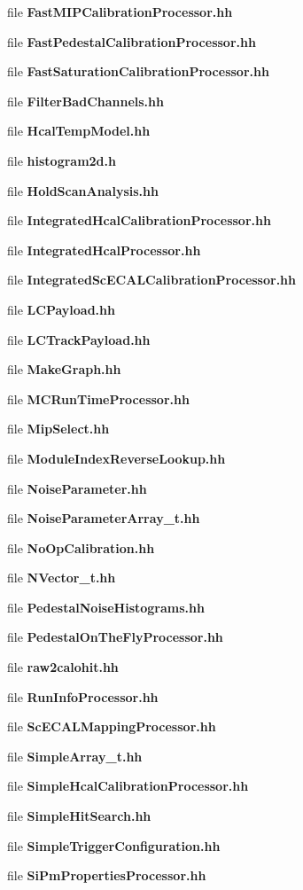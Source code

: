 \begin{DoxyCompactItemize}
\item 
file {\bfseries FastMIPCalibrationProcessor.hh}
\item 
file {\bfseries FastPedestalCalibrationProcessor.hh}
\item 
file {\bfseries FastSaturationCalibrationProcessor.hh}
\item 
file {\bfseries FilterBadChannels.hh}
\item 
file {\bfseries HcalTempModel.hh}
\item 
file {\bfseries histogram2d.h}
\item 
file {\bfseries HoldScanAnalysis.hh}
\item 
file {\bfseries IntegratedHcalCalibrationProcessor.hh}
\item 
file {\bfseries IntegratedHcalProcessor.hh}
\item 
file {\bfseries IntegratedScECALCalibrationProcessor.hh}
\item 
file {\bfseries LCPayload.hh}
\item 
file {\bfseries LCTrackPayload.hh}
\item 
file {\bfseries MakeGraph.hh}
\item 
file {\bfseries MCRunTimeProcessor.hh}
\item 
file {\bfseries MipSelect.hh}
\item 
file {\bfseries ModuleIndexReverseLookup.hh}
\item 
file {\bfseries NoiseParameter.hh}
\item 
file {\bfseries NoiseParameterArray\_\-t.hh}
\item 
file {\bfseries NoOpCalibration.hh}
\item 
file {\bfseries NVector\_\-t.hh}
\item 
file {\bfseries PedestalNoiseHistograms.hh}
\item 
file {\bfseries PedestalOnTheFlyProcessor.hh}
\item 
file {\bfseries raw2calohit.hh}
\item 
file {\bfseries RunInfoProcessor.hh}
\item 
file {\bfseries ScECALMappingProcessor.hh}
\item 
file {\bfseries SimpleArray\_\-t.hh}
\item 
file {\bfseries SimpleHcalCalibrationProcessor.hh}
\item 
file {\bfseries SimpleHitSearch.hh}
\item 
file {\bfseries SimpleTriggerConfiguration.hh}
\item 
file {\bfseries SiPmPropertiesProcessor.hh}

\end{DoxyCompactItemize}
